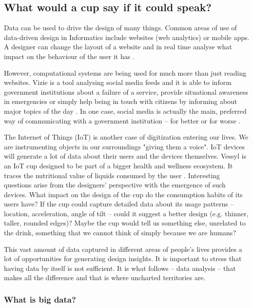 		\subsection{What would a cup say if it could speak?}

Data can be used to drive the design of many things. Common areas of use of data-driven design in Informatics include websites (web analytics) or mobile apps. A designer can change the layout of a website and in real time analyse what impact on the behaviour of the user it has \citep{CSIRO2015}.

However, computational systems are being used for much more than just reading websites. Vizie is a tool analysing social media feeds and it is able to inform government institutions about a failure of a service, provide situational awareness in emergencies or simply help being in touch with citizens by informing about major topics of the day \citep{CSIRO2015a}. In one case, social media is actually the main, preferred way of communicating with a government institution – for better or for worse \citep{MITMediaLab2015}.

The Internet of Things (IoT) is another case of digitization entering our lives. We are instrumenting objects in our surroundings "giving them a voice". IoT devices will generate a lot of data about their users and the devices themselves. Vessyl is an IoT cup designed to be part of a bigger health and wellness ecosystem. It traces the nutritional value of liquids consumed by the user \citep{MarkOne2014}. Interesting questions arise from the designers' perspective with the emergence of such devices. What impact on the design of the cup do the consumption habits of its users have? If the cup could capture detailed data about its usage patterns – location, acceleration, angle of tilt – could it suggest a better design (e.g. thinner, taller, rounded edges)? Maybe the cup would tell us something else, unrelated to the drink, something that we cannot think of simply because we are humans?

This vast amount of data captured in different areas of people's lives provides a lot of opportunities for generating design insights. It is important to stress that having data by itself is not sufficient. It is what follows – data analysis – that makes all the difference and that is where uncharted territories are.

			\subsubsection{What is big data?}

